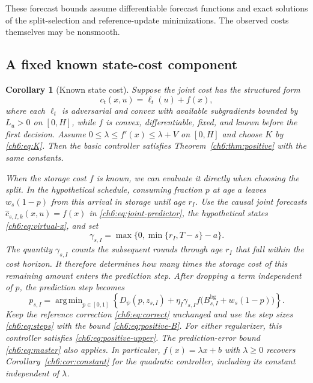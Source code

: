 \documentclass[11pt]{article}
\DeclareMathOperator*{\argmin}{arg\,min}
\theoremstyle{plain}
\newtheorem{Thm:Corollary}[Thm:Theorem]{Corollary}
\theoremstyle{remark}
\numberwithin{equation}{section}
\begin{document}
These forecast bounds assume differentiable forecast functions and exact
solutions of the split-selection and reference-update minimizations. The observed costs themselves may be
nonsmooth.

\subsection{A fixed known state-cost component}
\begin{Thm:Corollary}[Known state cost]\label{ch6:cor:known-state}
Suppose the joint cost has the structured form
\begin{equation}\label{ch6:eq:known-state-cost}
 c_t(x,u)=\ell_t(u)+f(x),
\end{equation}
where each $\ell_t$ is adversarial and convex with available subgradients
bounded by $L_u>0$ on $[0,H]$, while $f$ is convex, differentiable, fixed,
and known before the first decision. Assume
$0\le\lambda\le f'(x)\le\lambda+V$ on $[0,H]$ and choose $K$ by
\eqref{ch6:eq:K}. Then the basic controller satisfies
Theorem~\ref{ch6:thm:positive} with the same constants.

When the storage cost $f$ is known, we can evaluate it directly when
choosing the split. In the hypothetical schedule, consuming fraction $p$
at age $a$ leaves $w_s(1-p)$ from this arrival in storage until age $r_I$.
Use the causal joint forecasts $\widehat c_{s,I,k}(x,u)=f(x)$ in
\eqref{ch6:eq:joint-predictor}, the hypothetical states \eqref{ch6:eq:virtual-x}, and set
\[
 \gamma_{s,I}=\max\{0,\min\{r_I,T-s\}-a\}.
\]
The quantity $\gamma_{s,I}$ counts the subsequent rounds through age
$r_I$ that fall within the cost horizon. It therefore determines how
many times the storage cost of this remaining amount enters the
prediction step.
After dropping a term independent of $p$, the prediction step becomes
\begin{equation}\label{ch6:eq:known-state-prox}
 \boxed{p_{s,I}=\argmin_{p\in[0,1]}
 \left\{{D_\psi}(p,z_{s,I})+
 \eta_I\gamma_{s,I}
 f\bigl(B_{s,I}^{\mathrm{bg}}+w_s(1-p)\bigr)\right\}.}
\end{equation}
Keep the reference correction \eqref{ch6:eq:correct} unchanged and use the
step sizes \eqref{ch6:eq:steps} with the bound \eqref{ch6:eq:positive-B}.
For either regularizer, this controller satisfies
\eqref{ch6:eq:positive-upper}. The prediction-error bound
\eqref{ch6:eq:master} also applies.
In particular, $f(x)=\lambda x+b$ with $\lambda\ge0$ recovers
Corollary~\ref{ch6:cor:constant} for the quadratic controller, including its
constant independent of $\lambda$.
\end{Thm:Corollary}
\end{document}
